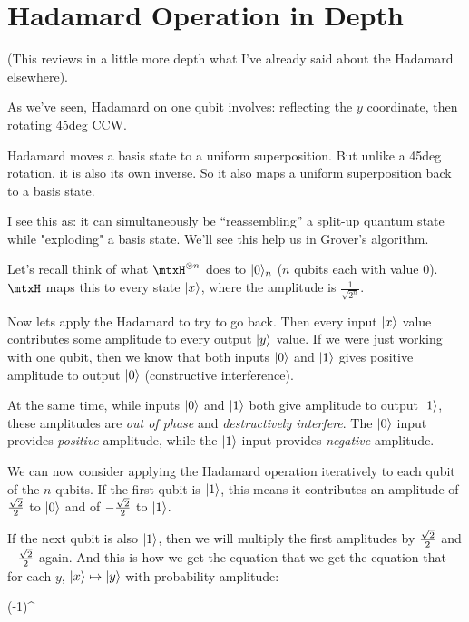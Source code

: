 \newcommand{\oket}{\braket{1}}
\newcommand{\zket}{\braket{0}}

\section{Hadamard Operation in Depth}

\begin{remark}
  (This reviews in a little more depth what I've already said about
  the Hadamard elsewhere).

  As we've seen, Hadamard on one qubit involves: reflecting the $y$
  coordinate, then rotating 45deg CCW.

  Hadamard moves a basis state to a uniform superposition. But unlike a
  45deg rotation, it is also its own inverse. So it also maps a uniform
  superposition back to a basis state.

  I see this as: it can simultaneously be ``reassembling'' a split-up
  quantum state while "exploding" a basis state. We'll see this help us
  in Grover's algorithm.
\end{remark}

\begin{remark}
  Let's recall think of what $\mtxH^{\otimes{n}}$ does to $\zket_n$ ($n$
  qubits each with value $0$). $\mtxH$ maps this to every state
  $|x\rangle$, where the amplitude is $\frac{1}{\sqrt{2^n}}$.

  Now lets apply the Hadamard to try to go back. Then every input
  $|x\rangle$ value contributes some amplitude to every output
  $|y\rangle$ value. If we were just working with one qubit, then we
  know that both inputs $\zket$ and $\oket$ gives positive amplitude to
  output $\zket$ (constructive interference).

  At the same time, while inputs $\zket$ and $\oket$ both give amplitude
  to output $\oket$, these amplitudes are \emph{out of phase} and
  \emph{destructively interfere}. The $\zket$ input provides
  \emph{positive} amplitude, while the $\oket$ input provides
  \emph{negative} amplitude.
\end{remark}

\begin{remark}
  We can now consider applying the Hadamard operation iteratively to
  each qubit of the $n$ qubits. If the first qubit is $\oket$, this
  means it contributes an amplitude of $\frac{\sqrt{2}}{2}$ to $\zket$ and of
  $-\frac{\sqrt{2}}{2}$ to $\oket$.

  If the next qubit is also $\oket$, then we will multiply the first
  amplitudes by $\frac{\sqrt{2}}{2}$ and $-\frac{\sqrt{2}}{2}$ again. And this is how we get the
  equation that we get the equation that for each $y$, $|x\rangle
  \mapsto |y\rangle$ with probability amplitude:

  \begin{nedqn}
    \sum (-1)^{} 
  \end{nedqn}
\end{remark}
